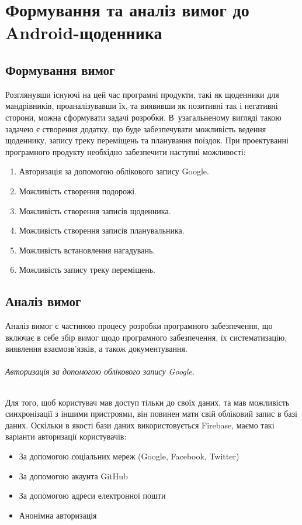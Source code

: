 \documentclass[../main.tex]{subfiles}
\begin{document}
\chapter{Формування та аналіз вимог до Android-щоденника}

\section{Формування вимог}

Розглянувши існуючі на цей час програмні продукти, такі як щоденники для мандрівників, проаналізувавши їх, та виявивши як позитивні так і негативні сторони, можна сформувати задачі розробки. В~узагальненому вигляді такою задачею є створення додатку, що буде забезпечувати можливість ведення щоденнику, запису треку переміщень та планування поїздок.
При проектуванні програмного продукту необхідно забезпечити наступні можливості:

\begin{enumerate}
	\item Авторизація за допомогою облікового запису Google.
	\item Можливість створення подорожі.
	\item Можливість створення записів щоденника.
	\item Можливість створення записів планувальника.
	\item Можливість встановлення нагадувань.
	\item Можливість запису треку переміщень.
\end{enumerate}

\section{Аналіз вимог}

Аналіз вимог є частиною процесу розробки програмного забезпечення, що включає в себе збір вимог щодо програмного забезпечення, їх систематизацію, виявлення взаємозв'язків, а також документування.

\subparagraph{Авторизація за допомогою облікового запису Google.}
Для того, щоб користувач мав доступ тільки до своїх даних, та мав можливість синхронізації з іншими пристроями, він повинен мати свій обліковий запис в базі даних. Оскільки в якості бази даних використовується Firebase, маємо такі варіанти авторизації користувачів: 
\begin{itemize}
	\item За допомогою соціальних мереж (Google, Facebook, Twitter)
	\item За допомогою акаунта GitHub
	\item За допомогою адреси електронної пошти
	\item Анонімна авторизація
\end{itemize}
\end{document}
